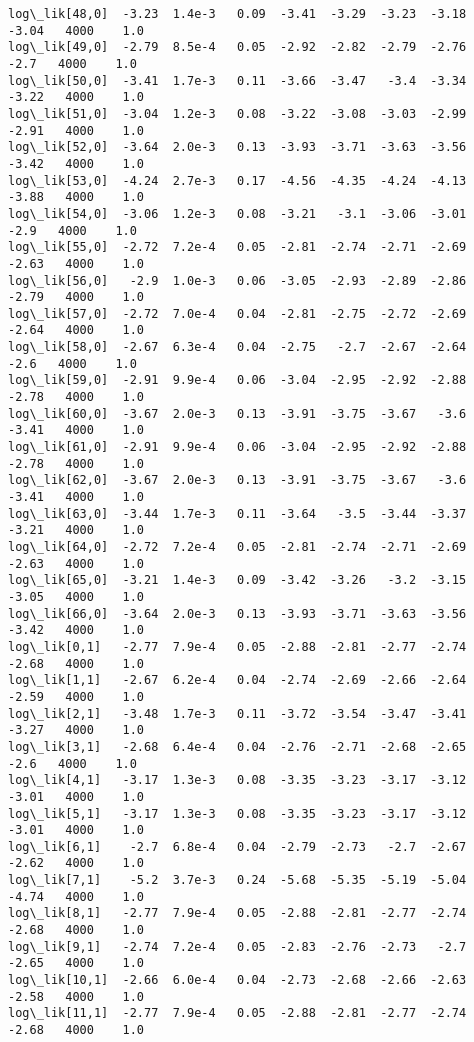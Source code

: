 \documentclass[11pt]{article}
\begin{document}
\begin{Verbatim}[commandchars=\\\{\}]
log\_lik[48,0]  -3.23  1.4e-3   0.09  -3.41  -3.29  -3.23  -3.18  -3.04   4000    1.0
log\_lik[49,0]  -2.79  8.5e-4   0.05  -2.92  -2.82  -2.79  -2.76   -2.7   4000    1.0
log\_lik[50,0]  -3.41  1.7e-3   0.11  -3.66  -3.47   -3.4  -3.34  -3.22   4000    1.0
log\_lik[51,0]  -3.04  1.2e-3   0.08  -3.22  -3.08  -3.03  -2.99  -2.91   4000    1.0
log\_lik[52,0]  -3.64  2.0e-3   0.13  -3.93  -3.71  -3.63  -3.56  -3.42   4000    1.0
log\_lik[53,0]  -4.24  2.7e-3   0.17  -4.56  -4.35  -4.24  -4.13  -3.88   4000    1.0
log\_lik[54,0]  -3.06  1.2e-3   0.08  -3.21   -3.1  -3.06  -3.01   -2.9   4000    1.0
log\_lik[55,0]  -2.72  7.2e-4   0.05  -2.81  -2.74  -2.71  -2.69  -2.63   4000    1.0
log\_lik[56,0]   -2.9  1.0e-3   0.06  -3.05  -2.93  -2.89  -2.86  -2.79   4000    1.0
log\_lik[57,0]  -2.72  7.0e-4   0.04  -2.81  -2.75  -2.72  -2.69  -2.64   4000    1.0
log\_lik[58,0]  -2.67  6.3e-4   0.04  -2.75   -2.7  -2.67  -2.64   -2.6   4000    1.0
log\_lik[59,0]  -2.91  9.9e-4   0.06  -3.04  -2.95  -2.92  -2.88  -2.78   4000    1.0
log\_lik[60,0]  -3.67  2.0e-3   0.13  -3.91  -3.75  -3.67   -3.6  -3.41   4000    1.0
log\_lik[61,0]  -2.91  9.9e-4   0.06  -3.04  -2.95  -2.92  -2.88  -2.78   4000    1.0
log\_lik[62,0]  -3.67  2.0e-3   0.13  -3.91  -3.75  -3.67   -3.6  -3.41   4000    1.0
log\_lik[63,0]  -3.44  1.7e-3   0.11  -3.64   -3.5  -3.44  -3.37  -3.21   4000    1.0
log\_lik[64,0]  -2.72  7.2e-4   0.05  -2.81  -2.74  -2.71  -2.69  -2.63   4000    1.0
log\_lik[65,0]  -3.21  1.4e-3   0.09  -3.42  -3.26   -3.2  -3.15  -3.05   4000    1.0
log\_lik[66,0]  -3.64  2.0e-3   0.13  -3.93  -3.71  -3.63  -3.56  -3.42   4000    1.0
log\_lik[0,1]   -2.77  7.9e-4   0.05  -2.88  -2.81  -2.77  -2.74  -2.68   4000    1.0
log\_lik[1,1]   -2.67  6.2e-4   0.04  -2.74  -2.69  -2.66  -2.64  -2.59   4000    1.0
log\_lik[2,1]   -3.48  1.7e-3   0.11  -3.72  -3.54  -3.47  -3.41  -3.27   4000    1.0
log\_lik[3,1]   -2.68  6.4e-4   0.04  -2.76  -2.71  -2.68  -2.65   -2.6   4000    1.0
log\_lik[4,1]   -3.17  1.3e-3   0.08  -3.35  -3.23  -3.17  -3.12  -3.01   4000    1.0
log\_lik[5,1]   -3.17  1.3e-3   0.08  -3.35  -3.23  -3.17  -3.12  -3.01   4000    1.0
log\_lik[6,1]    -2.7  6.8e-4   0.04  -2.79  -2.73   -2.7  -2.67  -2.62   4000    1.0
log\_lik[7,1]    -5.2  3.7e-3   0.24  -5.68  -5.35  -5.19  -5.04  -4.74   4000    1.0
log\_lik[8,1]   -2.77  7.9e-4   0.05  -2.88  -2.81  -2.77  -2.74  -2.68   4000    1.0
log\_lik[9,1]   -2.74  7.2e-4   0.05  -2.83  -2.76  -2.73   -2.7  -2.65   4000    1.0
log\_lik[10,1]  -2.66  6.0e-4   0.04  -2.73  -2.68  -2.66  -2.63  -2.58   4000    1.0
log\_lik[11,1]  -2.77  7.9e-4   0.05  -2.88  -2.81  -2.77  -2.74  -2.68   4000    1.0

\end{Verbatim}
\end{document}
